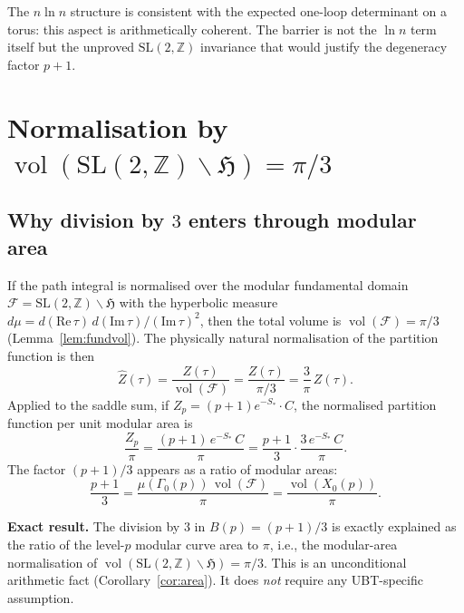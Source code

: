 \documentclass[12pt,a4paper]{article}
\theoremstyle{definition}
\theoremstyle{remark}
\newcommand{\SL}{\mathrm{SL}}
\newcommand{\vol}{\operatorname{vol}}
\newcommand{\bH}{\mathfrak{H}}     %
\newcommand{\ZZ}{\mathbb{Z}}
\newcommand{\Gam}{\Gamma}
\newcommand{\Zp}{Z_p}
\begin{document}
\begin{insightbox}
The $n\ln n$ structure is consistent with the expected one-loop determinant
on a torus: this aspect is arithmetically coherent.  The barrier is not
the $\ln n$ term itself but the unproved $\SL(2,\ZZ)$ invariance that
would justify the degeneracy factor $p+1$.
\end{insightbox}

\section{Normalisation by $\vol(\SL(2,\ZZ)\backslash\bH)=\pi/3$}
\label{sec:modular_norm}

\subsection{Why division by $3$ enters through modular area}

If the path integral is normalised over the modular fundamental domain
$\mathcal{F}=\SL(2,\ZZ)\backslash\bH$ with the hyperbolic measure
$d\mu=d(\mathrm{Re}\,\tau)\,d(\mathrm{Im}\,\tau)/(\mathrm{Im}\,\tau)^2$,
then the total volume is $\vol(\mathcal{F})=\pi/3$ (Lemma~\ref{lem:fundvol}).
The physically natural normalisation of the partition function is then
\begin{equation}
  \hat{Z}(\tau) = \frac{Z(\tau)}{\vol(\mathcal{F})} = \frac{Z(\tau)}{\pi/3} = \frac{3}{\pi}\,Z(\tau).
  \label{eq:normZ}
\end{equation}
Applied to the saddle sum, if $\Zp=(p+1)e^{-S_*}\cdot C$, the
normalised partition function per unit modular area is
\begin{equation}
  \frac{\Zp}{\pi} = \frac{(p+1)\,e^{-S_*}\,C}{\pi}
  = \frac{p+1}{3}\cdot\frac{3\,e^{-S_*}\,C}{\pi}.
  \label{eq:normsaddle}
\end{equation}
The factor $(p+1)/3$ appears as a ratio of modular areas:
\begin{equation}
  \frac{p+1}{3}
  = \frac{\mu(\Gam_0(p))\,\vol(\mathcal{F})}{\pi}
  = \frac{\vol(X_0(p))}{\pi}.
  \label{eq:ratio}
\end{equation}

\begin{resultbox}
\textbf{Exact result.}  The division by $3$ in $B(p)=(p+1)/3$ is
exactly explained as the ratio of the level-$p$ modular curve area to
$\pi$, i.e., the modular-area normalisation of
$\vol(\SL(2,\ZZ)\backslash\bH)=\pi/3$.  This is an unconditional
arithmetic fact (Corollary~\ref{cor:area}).  It does \emph{not} require
any UBT-specific assumption.
\end{resultbox}
\end{document}
